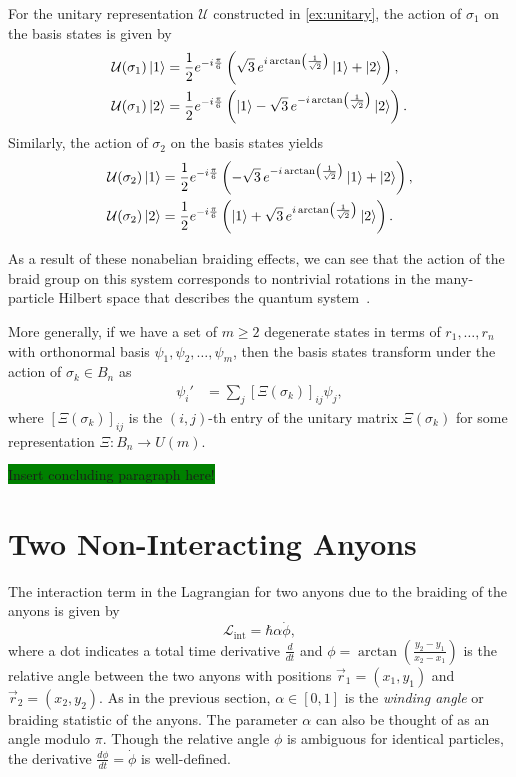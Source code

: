 For the unitary representation $\mathcal{U}$ constructed in \cref{ex:unitary}, the action of $\sigma_1$ on the basis states is given by
\begin{align*}
    \mathcal{U}(\sigma_1)\ket{1} &= \frac{1}{2}e^{-i\frac{\pi}{6}}\left( \sqrt{3}\,e^{i\arctan\left( \frac{1}{\sqrt{2}} \right)}\ket{1} + \ket{2} \right), \\
    \mathcal{U}(\sigma_1)\ket{2} &= \frac{1}{2}e^{-i\frac{\pi}{6}}\left( \ket{1} - \sqrt{3}\,e^{-i\arctan\left( \frac{1}{\sqrt{2}} \right)}\ket{2} \right).
\end{align*}
Similarly, the action of $\sigma_2$ on the basis states yields
\begin{align*}
    \mathcal{U}(\sigma_2)\ket{1} &= \frac{1}{2}e^{-i\frac{\pi}{6}}\left( -\sqrt{3}\,e^{-i\arctan\left( \frac{1}{\sqrt{2}} \right)}\ket{1} + \ket{2} \right), \\
    \mathcal{U}(\sigma_2)\ket{2} &= \frac{1}{2}e^{-i\frac{\pi}{6}}\left( \ket{1} + \sqrt{3}\,e^{i\arctan\left( \frac{1}{\sqrt{2}} \right)}\ket{2} \right).
\end{align*}

As a result of these nonabelian braiding effects, we can see that the action of the braid group on this system corresponds to nontrivial rotations in the many-particle Hilbert space that describes the quantum system~\cite{Nayak2008,Deshmukh}.

More generally, if we have a set of $m\geq 2$ degenerate states in terms of $r_1,\dots,r_n$ with orthonormal basis $\psi_1,\psi_2,\dots,\psi_m$, then the basis states transform under the action of $\sigma_k\in B_n$ as
\begin{align*}
    \psi_i' &= \sum_{j}{\left[ \Xi(\sigma_k) \right]}_{ij}\psi_j,
\end{align*}
where ${\left[ \Xi(\sigma_k) \right]}_{ij}$ is the $(i,j)$-th entry of the unitary matrix $\Xi(\sigma_k)$ for some representation $\Xi:B_n\to U(m)$.

\colorbox{green}{Insert concluding paragraph here!}


\section{Two Non-Interacting Anyons}\label{sec:non_int}

The interaction term in the Lagrangian for two anyons due to the braiding of the anyons is given by
\begin{equation}
    \mathcal{L}_{\text{int}} = \hbar\alpha\dot{\phi},
\end{equation}
where a dot indicates a total time derivative $\frac{d}{dt}$ and $\phi = \arctan\left( \frac{y_2-y_1}{x_2-x_1} \right)$ is the relative angle between the two anyons with positions $\vec{r}_1=(x_1,y_1)$ and $\vec{r}_2=(x_2,y_2)$. As in the previous section, $\alpha\in\left[ 0,1 \right]$ is the \textit{winding angle} or braiding statistic of the anyons. The parameter $\alpha$ can also be thought of as an angle modulo $\pi$. Though the relative angle $\phi$ is ambiguous for identical particles, the derivative $\frac{d\phi}{dt}=\dot{\phi}$ is well-defined.

